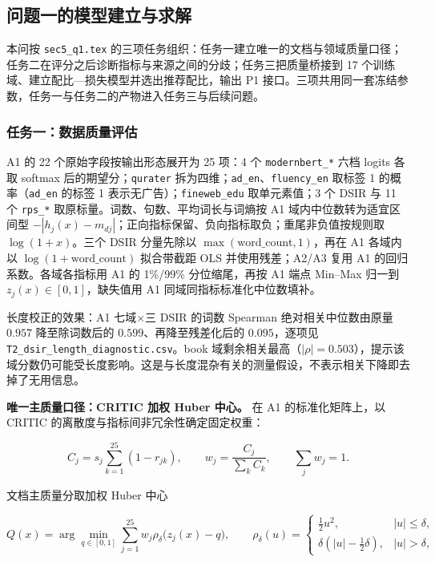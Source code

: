 \subsection{问题一的模型建立与求解}
\label{sec:5.2}

本问按 \texttt{sec5\_q1.tex} 的三项任务组织：任务一建立唯一的文档与领域质量口径；任务二在评分之后诊断指标与来源之间的分歧；任务三把质量桥接到 17 个训练域、建立配比—损失模型并选出推荐配比，输出 P1 接口。三项共用同一套冻结参数，任务一与任务二的产物进入任务三与后续问题。

\subsubsection{任务一：数据质量评估}
\label{sec:5.2.1}

A1 的 22 个原始字段按输出形态展开为 25 项：4 个 \texttt{modernbert\_*} 六档 logits 各取 softmax 后的期望分；\texttt{qurater} 拆为四维；\texttt{ad\_en}、\texttt{fluency\_en} 取标签 1 的概率（\texttt{ad\_en} 的标签 1 表示无广告）；\texttt{fineweb\_edu} 取单元素值；3 个 DSIR 与 11 个 \texttt{rps\_*} 取原标量。词数、句数、平均词长与词熵按 A1 域内中位数转为适宜区间型 $-|h_j(x)-m_{dj}|$；正向指标保留、负向指标取负；重尾非负值按规则取 $\log(1+x)$。三个 DSIR 分量先除以 $\max(\mathrm{word\_count},1)$，再在 A1 各域内以 $\log(1+\mathrm{word\_count})$ 拟合带截距 OLS 并使用残差；A2/A3 复用 A1 的回归系数。各域各指标用 A1 的 1\%/99\% 分位缩尾，再按 A1 端点 Min–Max 归一到 $z_j(x)\in[0,1]$，缺失值用 A1 同域同指标标准化中位数填补。

长度校正的效果：A1 七域$\times$三 DSIR 的词数 Spearman 绝对相关中位数由原量 $0.957$ 降至除词数后的 $0.599$、再降至残差化后的 $0.095$，逐项见 \texttt{T2\_dsir\_length\_diagnostic.csv}。book 域剩余相关最高（$|\rho|=0.503$），提示该域分数仍可能受长度影响。这是与长度混杂有关的测量假设，不表示相关下降即去掉了无用信息。

\textbf{唯一主质量口径：CRITIC 加权 Huber 中心。} 在 A1 的标准化矩阵上，以 CRITIC 的离散度与指标间非冗余性确定固定权重\cite{critic}：

\begin{equation*}
C_j=s_j\sum_{k=1}^{25}(1-r_{jk}),\qquad w_j=\frac{C_j}{\sum_kC_k},\qquad \sum_j w_j=1 .
\end{equation*}

文档主质量分取加权 Huber 中心\cite{huber}

\begin{equation*}
Q(x)=\arg\min_{q\in[0,1]}\sum_{j=1}^{25}w_j\rho_\delta\bigl(z_j(x)-q\bigr),\qquad
\rho_\delta(u)=\begin{cases}\tfrac12u^2,&|u|\le\delta,\\ \delta(|u|-\tfrac12\delta),&|u|>\delta,\end{cases}
\end{equation*}

